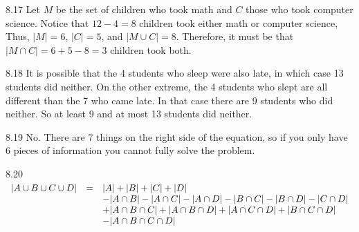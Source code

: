\begin{RequAnswer}{8.17}
Let $M$ be the set of children who took math and $C$
those who took computer science.
Notice that $12-4 = 8$ children took either math or computer science,
Thus,
$|M|=6$, $|C|=5$, and $|M\cup C|=8$. Therefore, it
must be that $|M\cap C|=6+5-8=3$ children took both.
\end{RequAnswer}
\begin{RequAnswer}{8.18}
It is possible that the 4 students who sleep were also late, in which case 13 students did neither.
On the other extreme, the 4 students who slept are all different than the 7 who came late.
In that case there are 9 students who did neither.
So at least 9 and at most 13 students did neither.
\end{RequAnswer}
\begin{RequAnswer}{8.19}
No. There are 7 things on the right side of the equation,
so if you only have 6 pieces of information you cannot fully solve the problem.
\end{RequAnswer}
\begin{RequAnswer}{8.20}
$
\begin{array}[t]{lll}
|A \cup B \cup C\cup D| & = & |A| + |B| + |C|+|D|\\ & &
-|A \cap B| - |A \cap C |  -|A\cap D| - |B \cap C| -|B\cap D| - |C\cap D|\\ & &
+|A \cap B \cap C|
+|A \cap B \cap D|
+|A \cap C \cap D|
+|B \cap C \cap D|\\ & &
-|A \cap B \cap C\cap D|
\end{array}
$
\end{RequAnswer}
